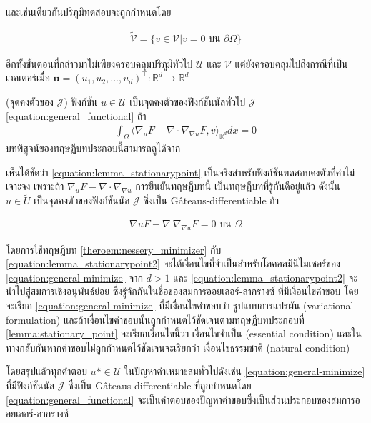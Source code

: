 และเช่นเดียวกันปริภูมิทดสอบจะถูกกำหนดโดย

\begin{align}
    \tilde{\mathcal{V}} = \{v \in \mathcal{V} | v = 0 \text{ บน } \partial \Omega \}
\end{align}

อีกทั้งขั้นตอนที่กล่าวมาไม่เพียงครอบคลุมปริภูมิทั่วไป $\mathcal{U}$ และ $\mathcal{V}$ แต่ยังครอบคลุมไปถึงกรณีที่เป็นเวคเตอร์เมื่อ $ \boldsymbol{u} = (u_1,u_2,...,u_d)^\top : \mathbb{R}^{d} \rightarrow \mathbb{R}^{d}$

\begin{Lemma}
    (จุดคงตัวของ $\mathcal{J}$) ฟังก์ชัน $u \in \mathcal{U}$ เป็นจุดคงตัวของฟังก์ชันนัลทั่วไป $\mathcal{J}$ \ref{equation:general_functional} ถ้า
    \begin{align}
        \int_{\Omega} \Big \langle \nabla_u F - \nabla \cdot \nabla_{\nabla u} F,v \Big \rangle_{\mathbb{R}^{d}} dx = 0
        \label{equation:lemma_stationarypoint}
    \end{align}
    \label{lemma:stationary_point}
    บทพิสูจน์ของทฤษฏีบทประกอบนี้สามารถดูได้จาก \cite{ref:general_functional_stationary}
\end{Lemma}

เห็นได้ชัดว่า \ref{equation:lemma_stationarypoint} เป็นจริงสำหรับฟังก์ชันทดสอบคงตัวที่ค่าไม่เจาะจง เพราะถ้า $\nabla_u F - \nabla \cdot \nabla_{\nabla u}$ การยืนยันทฤษฏีบทนี้ เป็นทฤษฏีบทที่รู้กันดีอยู่แล้ว ดังนั้น $u \in \tilde{U}$ เป็นจุดคงตัวของฟังก์ชันนัล $\mathcal{J}$ ซึ่งเป็น G\^{a}teaus-differentiable ถ้า 

\begin{align}
    \nabla u F - \nabla \ \nabla_{\nabla u} F = 0 \text{ บน } \Omega
    \label{equation:lemma_stationarypoint2}
\end{align}

โดยการใช้ทฤษฏีบท \ref{theroem:nessery_minimizer} กับ  \ref{equation:lemma_stationarypoint2} จะได้เงื่อนไขที่จำเป็นสำหรับโลคอลมินิไมเซอร์ของ \ref{equation:general-minimize} จาก $ d > 1$ และ \ref{equation:lemma_stationarypoint2} จะนำไปสู่สมการเชิงอนุพันธ์ย่อย ซึ่งรู้จักกันในชื่อของสมการออยเลอร์-ลากรางซ์ ที่มีเงื่อนไขค่าขอบ โดยจะเรียก \ref{equation:general-minimize} ที่มีเงื่อนไขค่าขอบว่า รูปแบบการแปรผัน (variational formulation) และถ้าเงื่อนไขค่าขอบนั้นถูกกำหนดไว้ชัดเจนตามทฤษฏีบทประกอบที่ \ref{lemma:stationary_point} จะเรียกเงื่อนไขนี้ว่า เงื่อนไขจำเป็น (essential condition) และในทางกลับกันหากค่าขอบไม่ถูกกำหนดไว้ชัดเจนจะเรียกว่า เงื่อนไขธรรมชาติ (natural condition) 

โดยสรุปแล้วทุกคำตอบ $u* \in \mathcal{U}$ ในปัญหาค่าเหมาะสมทั่วไปดังเช่น \ref{equation:general-minimize} ที่มีฟังก์ชันนัล $\mathcal{J}$ ซึ่งเป็น G\^{a}teaus-differentiable ที่ถูกกำหนดโดย \ref{equation:general_functional} จะเป็นคำตอบของปัญหาค่าขอบซึ่งเป็นส่วนประกอบของสมการออยเลอร์-ลากรางซ์


